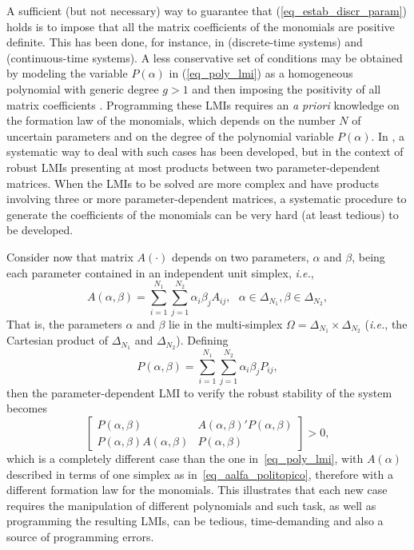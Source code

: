 \documentclass[english,11pt]{article}
\theoremstyle{break} \theorembodyfont{\small\rm}
\begin{document}
A sufficient
(but not necessary) way to guarantee that (\ref{eq_estab_discr_param}) holds is to impose
that all the matrix coefficients of the monomials are positive definite. This has been done, for instance, in \cite{RP:01b} (discrete-time systems) and \cite{RP:02} (continuous-time systems). 
A less conservative set of conditions
may be obtained by modeling the variable $P(\alpha)$ in (\ref{eq_poly_lmi}) as a
homogeneous polynomial with generic degree $g > 1$ and then imposing the positivity of all
matrix coefficients \cite{OP:06a,BOMP:06b}. Programming these LMIs requires
an \textit{a priori} knowledge on the formation law of the monomials, which depends
on the number $N$ of uncertain parameters and on the degree of the polynomial variable
$P(\alpha)$. In \cite{OP:07a}, a systematic way  to deal with such cases has been developed, but 
in the context of robust LMIs  presenting at most products between two parameter-dependent matrices.
When the LMIs to be solved are more complex and have products involving three or more parameter-dependent 
matrices, a systematic procedure to generate the coefficients of the monomials can be very hard (at least tedious) to be developed.

Consider now that matrix $A(\cdot)$ depends on two parameters, $\alpha$ and $\beta$, being each
parameter contained in an independent unit simplex, \textit{i.e.},
\begin{equation}
 A(\alpha,\beta) = \sum_{i = 1}^{N_1} \sum_{j = 1}^{N_2} \alpha_i \beta_j A_{ij}, ~~~\alpha \in \Delta_{N_1}, \beta \in \Delta_{N_2},
\end{equation}
That is, the parameters $\alpha$ and $\beta$ lie in the multi-simplex $\Omega = \Delta_{N_1} \times \Delta_{N_2}$
(\textit{i.e.}, the Cartesian product of $\Delta_{N_1}$ and 
$\Delta_{N_2}$). Defining
\begin{equation}
P(\alpha,\beta) = \sum_{i = 1}^{N_1} \sum_{j = 1}^{N_2} \alpha_i \beta_j P_{ij},
\end{equation}
then the parameter-dependent LMI to verify the robust stability of the system becomes
\begin{equation}
 \begin{bmatrix} P(\alpha,\beta) & A(\alpha,\beta)'P(\alpha,\beta) \\ P(\alpha,\beta)A(\alpha,\beta) & P(\alpha,\beta) \end{bmatrix} > 0,
\end{equation}
which is a completely different case than the one in~\eqref{eq_poly_lmi}, with $A(\alpha)$ described
in terms of one simplex as in~\eqref{eq_aalfa_politopico}, therefore with a different formation law for the monomials.
This illustrates that each new case requires the manipulation of different polynomials and such
task, as well as programming the resulting LMIs, can be tedious, time-demanding and
also a source of programming errors.
\end{document}
